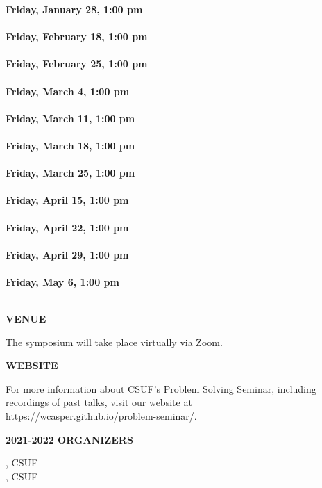 \documentclass[a4paper]{article}
\begin{document}
\begin{minipage}{0.95\textwidth}
\begin{minipage}[b]{0.47\textwidth}
{\leavevmode \raggedright
\textbf{\color{cprimary}Friday, January 28, 1:00 pm}\\ \\
\textbf{\color{cprimary}Friday, February 18, 1:00 pm}\\ \\
\textbf{\color{cprimary}Friday, February 25, 1:00 pm}\\ \\
\textbf{\color{cprimary}Friday, March 4, 1:00 pm}\\ \\
\textbf{\color{cprimary}Friday, March 11, 1:00 pm}\\ \\
\textbf{\color{cprimary}Friday, March 18, 1:00 pm}\\ \\
\textbf{\color{cprimary}Friday, March 25, 1:00 pm}\\ \\
\textbf{\color{cprimary}Friday, April 15, 1:00 pm}\\ \\
\textbf{\color{cprimary}Friday, April 22, 1:00 pm}\\ \\
\textbf{\color{cprimary}Friday, April 29, 1:00 pm}\\ \\
\textbf{\color{cprimary}Friday, May 6, 1:00 pm}\\ \\
\par{}
}

\vspace{0.0in}

\large{\color{csecondary}\textbf{VENUE}}

The symposium will take place virtually via Zoom.

\medskip

\large{\color{csecondary}\textbf{WEBSITE}}

For more information about CSUF's Problem Solving Seminar, including recordings of past talks, visit our website at\\ \href{https://wcasper.github.io/problem-seminar/}{https://wcasper.github.io/problem-seminar/}.

\medskip
\textbf{\color{csecondary}\large 2021-2022 ORGANIZERS}\par
{}, CSUF\\
, CSUF


\end{minipage}
\end{minipage}
\end{document}
